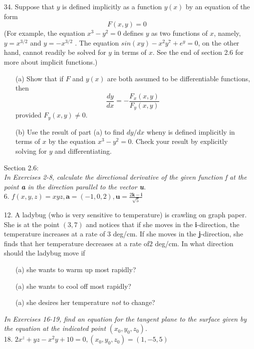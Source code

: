 \documentclass[12pt,letterpaper]{hmcpset}
\begin{document}
\begin{problem}
34. Suppose that $y$ is defined implicitly as a function $y(x)$
by an equation of the form
\begin{equation}
    F(x, y) = 0
\end{equation}
(For example, the equation $x^3 - y^2 = 0$ defines $y$ as
two functions of $x$, namely, $y = x^{3/2}$ and $y = -x^{3/2}$ .
The equation $sin(x y) - x^2y^7 + e^y = 0$, on the other
hand, cannot readily be solved for $y$ in terms of $x$. See
the end of section 2.6 for more about implicit functions.)

\begin{enumerate}
    \item[(a)] Show that if $F$ and $y(x)$ are both assumed to be
differentiable functions, then
\begin{equation}
    \frac{dy}{dx}=-\frac{F_x(x,y)}{F_y(x,y)}
\end{equation}
provided $F_y(x,y)\neq0$.

    \item[(b)] Use the result of part (a) to find $dy/dx$ when$ $y
is defined implicitly in terms of $x$ by the equation $x^3 - y^2 = 0$. Check your result by explicitly
solving for $y$ and differentiating.
\end{enumerate}
\end{problem}

\newpage


\begin{problem}
Section 2.6:
\\
\textit{In Exercises 2-8, calculate the directional derivative of the
given function f at the point \textbf{a} in the direction parallel to the
vector \textbf{u}.}
\\
6. $ f (x, y, z) = xyz, \mathbf{a} = (-1, 0, 2), \mathbf{u}=\frac{2\mathbf{k}-\mathbf{i}}{\sqrt{5}}$
\end{problem}

\newpage


\begin{problem}
12. A ladybug (who is very sensitive to temperature) is
crawling on graph paper. She is at the point $(3, 7)$ and
notices that if she moves in the \textbf{i}-direction, the temperature increases at a rate of $3$ deg/cm. If she moves
in the \textbf{j}-direction, she finds that her temperature decreases at a rate of$2$ deg/cm. In what direction should
the ladybug move if
\begin{enumerate}
    \item[(a)] she wants to warm up most rapidly?
    \item[(a)] she wants to cool off most rapidly? 
    \item[(a)] she desires her temperature \textit{not} to change? 
\end{enumerate}
\end{problem}

\newpage


\begin{problem}
\textit{In Exercises 16-19, find an equation for the tangent plane to
the surface given by the equation at the indicated point $(x_0, y_0,
z_0)$.}
\\
18. $2x^z + yz - x^2 y + 10 = 0, (x_0 , y_0 , z_0 ) = (1, -5, 5)$
\end{problem}
\end{document}
